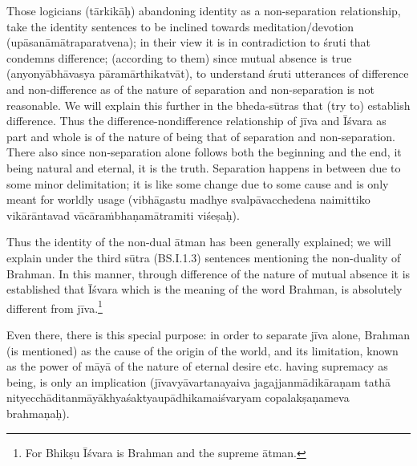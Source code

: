 

Those logicians (tārkikāḥ) abandoning identity as a non-separation relationship, take the identity sentences to be inclined towards meditation/devotion (upāsanāmātraparatvena); in their view it is in contradiction to śruti that condemns difference; (according to them) since mutual absence is true (anyonyābhāvasya pāramārthikatvāt), to understand śruti utterances of difference and non-difference as of the nature of separation and non-separation is not reasonable. We will explain this further in the bheda-sūtras that (try to) establish difference. Thus the difference-nondifference relationship of jīva and Īśvara as part and whole is of the nature of being that of separation and non-separation. There also since non-separation alone follows both the beginning and the end, it being natural and eternal, it is the truth. Separation happens in between due to some minor delimitation; it is like some change due to some cause and is only meant for worldly usage (vibhāgastu madhye svalpāvacchedena naimittiko vikārāntavad vācāraṁbhaṇamātramiti viśeṣaḥ).

Thus the identity of the non-dual ātman has been generally explained; we will explain under the third sūtra (BS.I.1.3) sentences mentioning the non-duality of Brahman. In this manner, through difference of the nature of mutual absence it is established that Īśvara which is the meaning of the word Brahman, is absolutely different from jīva.\footnote{For Bhikṣu Īśvara is Brahman and the supreme ātman.} 

Even there, there is this special purpose: in order to separate jīva alone, Brahman (is mentioned) as the cause of the origin of the world, and its limitation, known as the power of māyā of the nature of eternal desire etc. having supremacy as being, is only an implication (jīvavyāvartanayaiva jagajjanmādikāraṇam tathā nityecchāditanmāyākhyaśak\-\break\hbox{tyau\-pādhikamaiśvaryam} copalakṣaṇameva brahmaṇaḥ).

